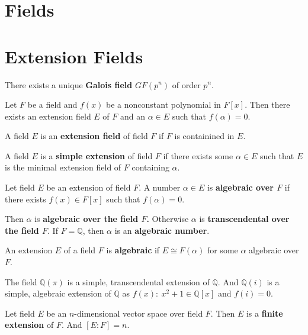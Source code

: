 \section{Fields}

\section{Extension Fields}
\begin{definition}
	There exists a unique \textbf{Galois field} $GF(p^n)$ of order $p^n$.
\end{definition}

\begin{theorem}[Kronecker]
	Let $F$ be a field and $f(x)$ be a nonconstant polynomial in $F[x]$.
	Then there exists an extension field $E$ of $F$ and an $\alpha \in E$ such that $f(\alpha) = 0$.
\end{theorem}

\begin{definition}
	A field $E$ is an \textbf{extension field} of field $F$ if $F$ is containined in $E$.
\end{definition}

\begin{definition}
	A field $E$ is a \textbf{simple extension} of field $F$ if there exists some $\alpha \in E$ such that $E$ is the minimal extension field of $F$ containing $\alpha$.
\end{definition}

\begin{definition}
	Let field $E$ be an extension of field $F$.
	A number $\alpha \in E$ is \textbf{algebraic over $F$} if there exists $f(x) \in F[x]$ such that $f(\alpha) = 0$.
\end{definition}

	Then $\alpha$ is \textbf{algebraic over the field $F$.}
	Otherwise $\alpha$ is \textbf{transcendental over the field $F$}.
	If $F = \mathbb{Q}$, then $\alpha$ is an \textbf{algebraic number}.

\begin{definition}
	An extension $E$ of a field $F$ is \textbf{algebraic} if $E \cong F(\alpha)$ for some $\alpha$ algebraic over $F$.
\end{definition}
	The field $\mathbb{Q}(\pi)$ is a simple, transcendental extension of $\mathbb{Q}$.
	And $\mathbb{Q}(i)$ is a simple, algebraic extension of $\mathbb{Q}$ as $f(x):\ x^2+1 \in \mathbb{Q}[x]$ and $f(i) = 0$.

\begin{definition}
	Let field $E$ be an $n$-dimensional vector space over field $F$.
	Then $E$ is a \textbf{finite extension} of $F$.
	And $[E:F] = n$.
\end{definition}

